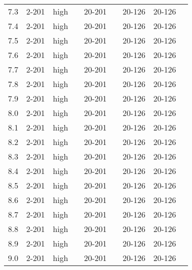 \documentclass{article}
\begin{document}
\begin{center}
\begin{tabular}{| c | c | c | c | c | c | c | c | c |}
      7.3 & 2-201 & high &  & 20-201 &  & 20-126 & 20-126 &\\
      7.4 & 2-201 & high &  & 20-201 &  & 20-126 & 20-126 &\\
      7.5 & 2-201 & high &  & 20-201 &  & 20-126 & 20-126 &\\
      7.6 & 2-201 & high &  & 20-201 &  & 20-126 & 20-126 &\\
      7.7 & 2-201 & high &  & 20-201 &  & 20-126 & 20-126 &\\
      7.8 & 2-201 & high &  & 20-201 &  & 20-126 & 20-126 &\\
      7.9 & 2-201 & high &  & 20-201 &  & 20-126 & 20-126 &\\
      8.0 & 2-201 & high &  & 20-201 &  & 20-126 & 20-126 &\\
      8.1 & 2-201 & high &  & 20-201 &  & 20-126 & 20-126 &\\
      8.2 & 2-201 & high &  & 20-201 &  & 20-126 & 20-126 &\\
      8.3 & 2-201 & high &  & 20-201 &  & 20-126 & 20-126 &\\
      8.4 & 2-201 & high &  & 20-201 &  & 20-126 & 20-126 &\\
      8.5 & 2-201 & high &  & 20-201 &  & 20-126 & 20-126 &\\
      8.6 & 2-201 & high &  & 20-201 &  & 20-126 & 20-126 &\\
      8.7 & 2-201 & high &  & 20-201 &  & 20-126 & 20-126 &\\
      8.8 & 2-201 & high &  & 20-201 &  & 20-126 & 20-126 &\\
      8.9 & 2-201 & high &  & 20-201 &  & 20-126 & 20-126 &\\
      9.0 & 2-201 & high &  & 20-201 &  & 20-126 & 20-126 &\\
      \hline
    \end{tabular}
    \end{center}
\end{document}
